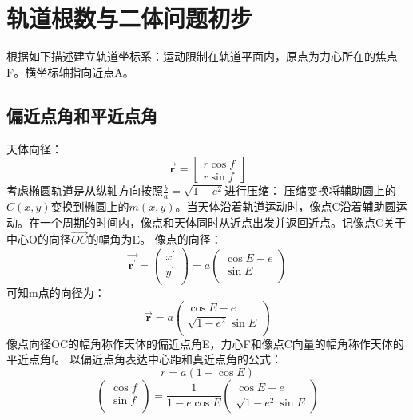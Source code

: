 \section{轨道根数与二体问题初步}
根据如下描述建立轨道坐标系：运动限制在轨道平面内，原点为力心所在的焦点F。横坐标轴指向近点A。
\subsection{偏近点角和平近点角}
天体向径：
\begin{equation}
	\vec{\mathbf{r}}=\begin{bmatrix}
		r\cos f\\
		r \sin f
	\end{bmatrix}
\end{equation}
考虑椭圆轨道是从纵轴方向按照$\frac{b}{a}=\sqrt{1-e^2}$进行压缩：
压缩变换将辅助圆上的$C(x,y)$变换到椭圆上的$m(x,y)$。当天体沿着轨道运动时，像点C沿着辅助圆运动。在一个周期的时间内，像点和天体同时从近点出发并返回近点。记像点C关于中心O的向径$\vec{OC}$的幅角为E。
像点的向径：
\begin{equation}
	\vec{\mathbf{r^\prime}}=\begin{pmatrix}
		x^\prime \\
		y^\prime \\
	\end{pmatrix}=a	\begin{pmatrix}
		\cos E -e\\
		\sin E\\	
		\end{pmatrix}
\end{equation}
可知m点的向径为：
\begin{equation}
	\vec{\mathbf{r}}=a\begin{pmatrix}
		\cos E-e\\
		\sqrt{1-e^2}\sin E\\
	\end{pmatrix}
\end{equation}
像点向径OC的幅角称作天体的偏近点角E，力心F和像点C向量的幅角称作天体的平近点角f。
以偏近点角表达中心距和真近点角的公式：
\begin{equation}
	r=a(1-\cos E)
\end{equation}
\begin{equation}
	\begin{pmatrix}
		\cos f\\
		\sin f\\
	\end{pmatrix}
=\frac{1}{1-e\cos E}\begin{pmatrix}
	\cos E-e\\
	\sqrt{1-e^2}\sin E
\end{pmatrix}
\end{equation}
